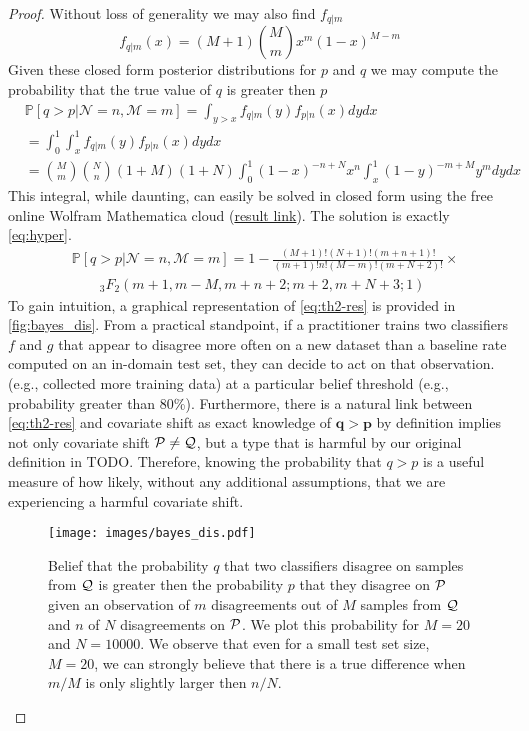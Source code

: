 \begin{proof}
    Without loss of generality we may also find $f_{q| m}$
    \begin{equation}
        f_{q| m}(x) = (M+1) \binom{M}{m} x^{m} (1-x)^{M-{m}}
        \label{eq:cond_pmf}
    \end{equation}
    Given these closed form posterior distributions for $p$ and $q$ we may compute the probability that the true value of $q$ is greater then $p$
    \begin{align}
        &\mathbb{P}[q > p | \mathcal{N}=n, \mathcal{M}=m] = \int_{y>x} f_{q|m}(y)f_{p|n}(x) dy dx\\
        &= \int_0^1\int_{x}^1 f_{q|m}(y)f_{p|n}(x) dy dx\\
        & = \binom{M}{m} \binom{N}{n}  (1+M) (1+N) \int_0^1 (1-x)^{-n+N} x^n \int_x^1 (1-y)^{-m+M} y^m dydx
    \end{align}
    This integral, while daunting, can easily be solved in closed form using the free online Wolfram Mathematica cloud (\href{https://www.wolframcloud.com/obj/87815d61-488b-4741-b62e-398aca5d8dae}{result link}).
    The solution is exactly \autoref{eq:hyper}.
    \begin{align}
        &\mathbb{P}[q > p | \mathcal{N}=n, \mathcal{M}=m] =1 -\frac{(M+1)! (N+1)! (m+n+1)!}{(m+1)! n! (M-m)! (m+N+2)!} \times \label{eq:th2-res}\\
        &  \quad\quad_3F_2(m+1,m-M,m+n+2;m+2,m+N+3;1) \nonumber
    \end{align}
    To gain intuition, a graphical representation of \autoref{eq:th2-res} is provided in \autoref{fig:bayes_dis}.
    From a practical standpoint, if a practitioner trains two classifiers $f$ and $g$ that appear to disagree more often on a new dataset than a baseline rate computed on an in-domain test set, they can decide to act on that observation.
    (e.g., collected more training data) at a particular belief threshold (e.g., probability greater than 80\%).
    Furthermore, there is a natural link between \autoref{eq:th2-res} and covariate shift as exact knowledge of $\mathbf{q} > \mathbf{p}$ by definition implies not only covariate shift $\mathcal{P} \neq \mathcal{Q}$,
    but a type that is harmful by our original definition in TODO.
    Therefore, knowing the probability that $q>p$ is a useful measure of how likely, without any additional assumptions, that we are experiencing a harmful covariate shift.

    \begin{figure}
        \centering
        \texttt{[image: images/bayes\_dis.pdf]}
        \caption{Belief that the probability $q$ that two classifiers disagree on samples from $\mathcal{Q}$ is greater then the probability $p$ that they disagree on $\mathcal{P}$ given an observation of $m$ disagreements out of $M$ samples from $\mathcal{Q}$ and $n$ of $N$ disagreements on $\mathcal{P}$.
        We plot this probability for $M=20$ and $N=10000$. We observe that even for a small test set size, $M=20$, we can strongly believe that there is a true difference when $m/M$ is only slightly larger then $n/N$.}
        \label{fig:bayes_dis}
    \end{figure}

\end{proof}